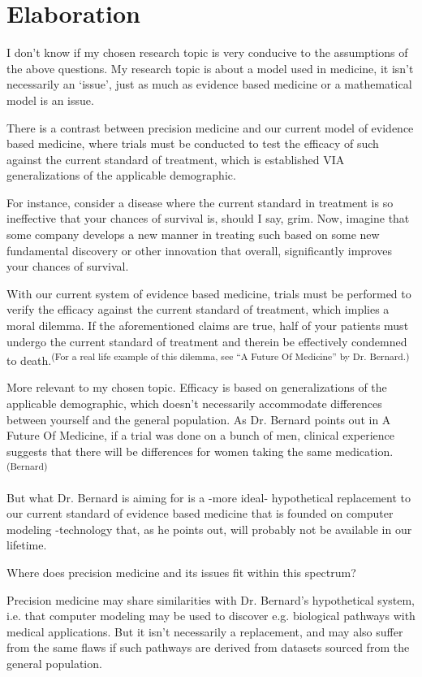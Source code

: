 \section*{Elaboration}

I don’t know if my chosen research topic is very conducive to the assumptions of the above questions. My research topic is about a model used in medicine, it isn’t necessarily an ‘issue’, just as much as evidence based medicine or a mathematical model is an issue.

There is a contrast between precision medicine and our current model of evidence based medicine, where trials must be conducted to test the efficacy of such against the current standard of treatment, which is established VIA generalizations of the applicable demographic.

For instance, consider a disease where the current standard in treatment is so ineffective that your chances of survival is, should I say, grim. Now, imagine that some company develops a new manner in treating such based on some new fundamental discovery or other innovation that overall, significantly improves your chances of survival. 

With our current system of evidence based medicine, trials must be performed to verify the efficacy against the current standard of treatment, which implies a moral dilemma. If the aforementioned claims are true, half of your patients must undergo the current standard of treatment and therein be effectively condemned to death.\textsuperscript{(For a real life example of this dilemma, see “A Future Of Medicine” by Dr. Bernard.)}

More relevant to my chosen topic. Efficacy is based on generalizations of the applicable demographic, which doesn’t necessarily accommodate differences between yourself and the general population. As Dr. Bernard points out in A Future Of Medicine, if a trial was done on a bunch of men, clinical experience suggests that there will be differences for women taking the same medication.\textsuperscript{(Bernard)}

But what Dr. Bernard is aiming for is a -more ideal- hypothetical replacement to our current standard of evidence based medicine that is founded on computer modeling -technology that, as he points out, will probably not be available in our lifetime.

Where does precision medicine and its issues fit within this spectrum?

Precision medicine may share similarities with Dr. Bernard’s hypothetical system, i.e. that computer modeling may be used to discover e.g. biological pathways with medical applications. But it isn’t necessarily a replacement, and may also suffer from the same flaws if such pathways are derived from datasets sourced from the general population. 

